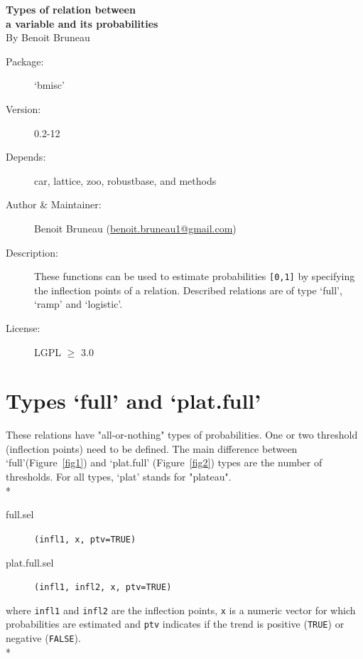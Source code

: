 \documentclass[letterpaper, 12pt]{article}
\begin{document}
\begin{titlepage}
\vspace*{3cm}
\begin{center}

\huge{\bf Types of relation between \\ a variable and its probabilities}\\

\vspace*{2cm}
\large{By Benoit Bruneau}
\end{center}
\vspace*{4cm}

\begin{description}
\item[Package:] `bmisc'
\item[Version:] 0.2-12
\item[Depends:] car, lattice, zoo, robustbase, and methods
\item[Author \& Maintainer:] Benoit Bruneau (\href{mailto:benoit.bruneau1@gmail.com}{benoit.bruneau1@gmail.com})
\item[Description:] These functions can be used to estimate probabilities \verb=[0,1]= by specifying the inflection points of a relation. Described relations are of type `full', `ramp' and `logistic'.
\item[License:] LGPL $\geqslant$ 3.0
\end{description}


\vspace*{\fill;}


\end{titlepage}

\tableofcontents
\newpage

\section{Types `full' and `plat.full'}
\noindent These relations have "all-or-nothing" types of probabilities. One or two threshold (inflection points) need to be defined. 
The main difference between `full'(Figure~\ref{fig1}) and `plat.full' (Figure~\ref{fig2}) types 
are the number of thresholds. For all types, `plat' stands for "plateau".\\*

\begin{description}
\item[full.sel]\verb#(infl1, x, ptv=TRUE)#
\item[plat.full.sel]\verb#(infl1, infl2, x, ptv=TRUE)#
\end{description}
where \verb#infl1# and \verb#infl2# are the inflection points, \verb#x# is a numeric vector for which probabilities are 
estimated and \verb#ptv# indicates if the trend is positive  (\verb#TRUE#) or negative (\verb#FALSE#).\\*
\end{document}
